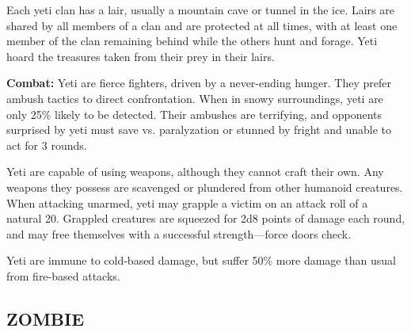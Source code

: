 \begin{multicols}{2}
Each yeti clan has a lair, usually a mountain cave or tunnel in the ice. Lairs are shared by all members of a clan and are protected at all times, with at least one member of the clan remaining behind while the others hunt and forage. Yeti hoard the treasures taken from their prey in their lairs.

\textbf{Combat:} Yeti are fierce fighters, driven by a never-ending hunger. They prefer ambush tactics to direct confrontation. When in snowy surroundings, yeti are only 25\% likely to be detected. Their ambushes are terrifying, and opponents surprised by yeti must save vs. paralyzation or stunned by fright and unable to act for 3 rounds.

Yeti are capable of using weapons, although they cannot craft their own. Any weapons they possess are scavenged or plundered from other humanoid creatures. When attacking unarmed, yeti may grapple a victim on an attack roll of a natural 20. Grappled creatures are squeezed for 2d8 points of damage each round, and may free themselves with a successful strength---force doors check.

Yeti are immune to cold-based damage, but suffer 50\% more damage than usual from fire-based attacks.

\noindent
\begin{minipage}{\columnwidth}

\vspace{1em}

\subsection{ZOMBIE}


\end{minipage}
\end{multicols}
